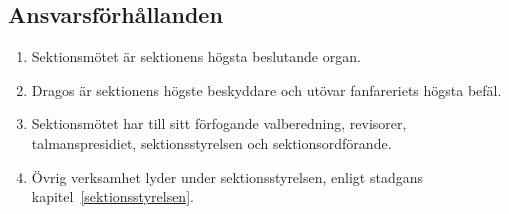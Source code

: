 \documentclass[11pt,a4paper]{article}
\begin{document}
\subsection{Ansvarsförhållanden}
\begin{enumerate}[\thesubsection.1]

  \item Sektionsmötet är sektionens högsta beslutande organ.

  \item Dragos är sektionens högste beskyddare och utövar
   fanfareriets högsta befäl.

  \item Sektionsmötet har till sitt förfogande valberedning,
   revisorer, talmanspresidiet, sektionsstyrelsen och sektionsordförande.

  \item Övrig verksamhet lyder under sektionsstyrelsen, enligt stadgans kapitel~\ref{sektionsstyrelsen}.

\end{enumerate}
\end{document}
